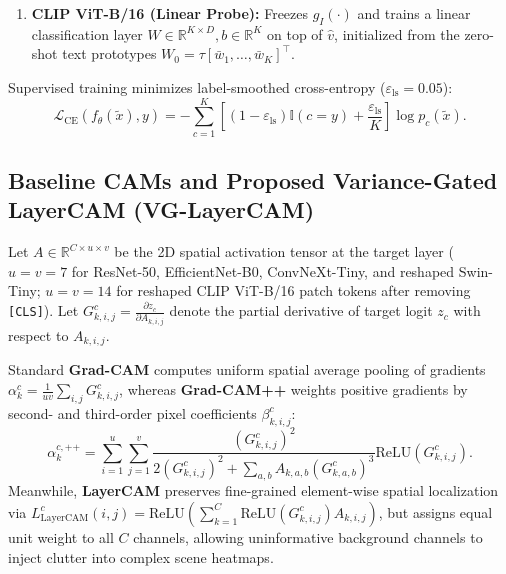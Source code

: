\documentclass[final,5p,times,twocolumn]{elsarticle}
\begin{document}
\begin{enumerate}
    \begin{equation}
        \bar{w}_c = \frac{\sum_{m=1}^{M} \hat{g}_T(t_{c,m})}{\left\| \sum_{m=1}^{M} \hat{g}_T(t_{c,m}) \right\|_2}, \quad z_c^{\text{ZS}}(\tilde{x}) = \tau \cdot (\hat{v}^\top \bar{w}_c),
    \end{equation}
    where $\hat{v} = g_I(\tilde{x}_{\text{clip}}) / \|g_I(\tilde{x}_{\text{clip}})\|_2$ and $\tau = \exp(\text{logit\_scale})$.
    \item \textbf{CLIP ViT-B/16 (Linear Probe):} Freezes $g_I(\cdot)$ and trains a linear classification layer $W \in \mathbb{R}^{K \times D}, b \in \mathbb{R}^K$ on top of $\hat{v}$, initialized from the zero-shot text prototypes $W_0 = \tau [\bar{w}_1, \dots, \bar{w}_K]^\top$.
\end{enumerate}

Supervised training minimizes label-smoothed cross-entropy ($\varepsilon_{\text{ls}} = 0.05$):
\begin{equation}
    \mathcal{L}_{\text{CE}}(f_\theta(\tilde{x}), y) = -\sum_{c=1}^{K} \left[ (1 - \varepsilon_{\text{ls}})\mathbb{I}(c = y) + \frac{\varepsilon_{\text{ls}}}{K} \right] \log p_c(\tilde{x}).
    \label{eq:ls_ce}
\end{equation}

\subsection{Baseline CAMs and Proposed Variance-Gated LayerCAM (VG-LayerCAM)}
Let $A \in \mathbb{R}^{C \times u \times v}$ be the 2D spatial activation tensor at the target layer ($u=v=7$ for ResNet-50, EfficientNet-B0, ConvNeXt-Tiny, and reshaped Swin-Tiny; $u=v=14$ for reshaped CLIP ViT-B/16 patch tokens after removing \texttt{[CLS]}). Let $G_{k,i,j}^c = \frac{\partial z_c}{\partial A_{k,i,j}}$ denote the partial derivative of target logit $z_c$ with respect to $A_{k,i,j}$.

Standard \textbf{Grad-CAM} \cite{selvaraju2017grad} computes uniform spatial average pooling of gradients $\alpha_k^c = \frac{1}{u v} \sum_{i,j} G_{k,i,j}^c$, whereas \textbf{Grad-CAM++} \cite{chattopadhay2018grad} weights positive gradients by second- and third-order pixel coefficients $\beta_{k,i,j}^c$:
\begin{equation}
    \alpha_k^{c,\text{++}} = \sum_{i=1}^{u} \sum_{j=1}^{v} \frac{(G_{k,i,j}^c)^2}{2(G_{k,i,j}^c)^2 + \sum_{a,b} A_{k,a,b} (G_{k,a,b}^c)^3} \text{ReLU}(G_{k,i,j}^c).
\end{equation}
Meanwhile, \textbf{LayerCAM} \cite{jiang2021layercam} preserves fine-grained element-wise spatial localization via $L_{\text{LayerCAM}}^c(i,j) = \text{ReLU}\!\left(\sum_{k=1}^C \text{ReLU}(G_{k,i,j}^c) A_{k,i,j}\right)$, but assigns equal unit weight to all $C$ channels, allowing uninformative background channels to inject clutter into complex scene heatmaps.
\end{document}
